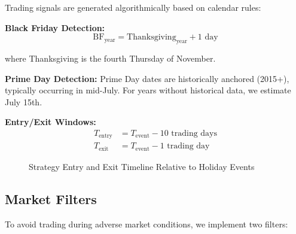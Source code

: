 \documentclass[twocolumn,ieee]{arithmaxresearch}
\begin{document}
Trading signals are generated algorithmically based on calendar rules:

\textbf{Black Friday Detection:}
\begin{equation}
\text{BF}_{\text{year}} = \text{Thanksgiving}_{\text{year}} + 1 \text{ day}
\end{equation}

where Thanksgiving is the fourth Thursday of November.

\textbf{Prime Day Detection:}
Prime Day dates are historically anchored (2015+), typically occurring in mid-July. For years without historical data, we estimate July 15th.

\textbf{Entry/Exit Windows:}
\begin{align}
T_{\text{entry}} &= T_{\text{event}} - 10 \text{ trading days} \\
T_{\text{exit}} &= T_{\text{event}} - 1 \text{ trading day}
\end{align}

\begin{figure}[!t]
\centering
{}
\caption{Strategy Entry and Exit Timeline Relative to Holiday Events}
\label{fig:timeline}
\end{figure}

\subsection{Market Filters}

To avoid trading during adverse market conditions, we implement two filters:
\end{document}
